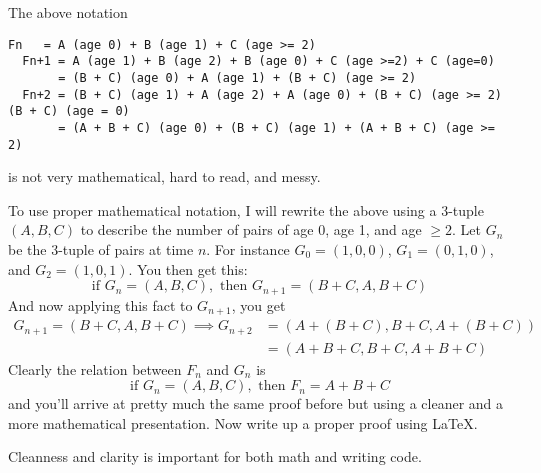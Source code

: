The above notation
\begin{Verbatim}[fontsize=\footnotesize]
  Fn   = A (age 0) + B (age 1) + C (age >= 2)
  Fn+1 = A (age 1) + B (age 2) + B (age 0) + C (age >=2) + C (age=0)
       = (B + C) (age 0) + A (age 1) + (B + C) (age >= 2)
  Fn+2 = (B + C) (age 1) + A (age 2) + A (age 0) + (B + C) (age >= 2)  (B + C) (age = 0)
       = (A + B + C) (age 0) + (B + C) (age 1) + (A + B + C) (age >= 2)
  \end{Verbatim}
is not very mathematical, hard to read, and messy.

To use proper mathematical notation, I will rewrite the above
using a 3-tuple $(A, B, C)$
to describe the number of pairs of age 0, age 1, and age $\geq 2$.
Let $G_n$ be the 3-tuple of pairs at time $n$.
For instance $G_0 = (1, 0, 0)$, $G_1 = (0, 1, 0)$, and $G_2 = (1, 0, 1)$.
You then get this:
\[
\text{if } G_n = (A, B, C), \text{ then }
G_{n+1} = (B + C, A, B + C)
\]
And now applying this fact to $G_{n + 1}$, you get
\begin{align*}
G_{n+1} = (B + C, A, B + C) \implies
G_{n + 2} &= (A + (B + C), B + C, A + (B + C)) \\
         &= (A + B + C, B + C, A + B + C)
\end{align*}
Clearly the relation between $F_n$ and $G_n$ is
\[
\text{if } G_n = (A,B,C), \text{ then } F_n = A + B + C
\]
and you'll arrive at pretty much the same proof before
but using a cleaner and a more mathematical presentation.
Now write up a proper proof using \LaTeX.

Cleanness and clarity is important for both math and writing code.







